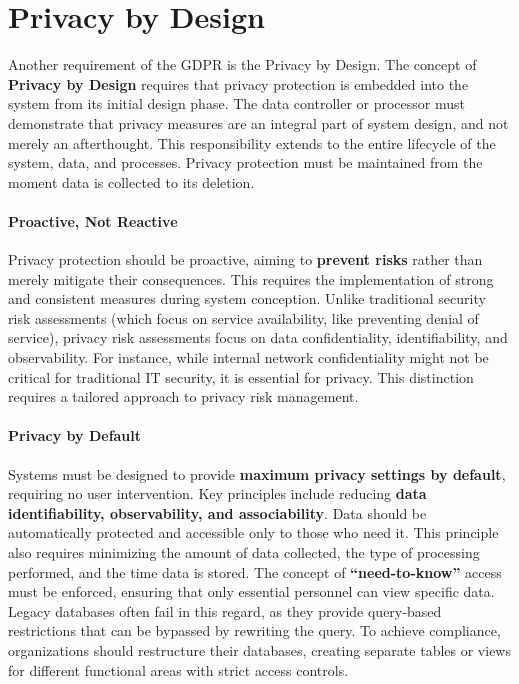 \section{Privacy by Design}
Another requirement of the GDPR is the Privacy by Design.
The concept of \textbf{Privacy by Design} requires that privacy
protection is embedded into the system from its initial design phase.
The data controller or processor must demonstrate that privacy
measures are an integral part of system design, and not merely an
afterthought. This responsibility extends to the entire lifecycle of
the system, data, and processes. Privacy protection must be maintained
from the moment data is collected to its deletion.

\paragraph{Proactive, Not Reactive}  
Privacy protection should be proactive, aiming to \textbf{prevent
risks} rather than merely mitigate their consequences. This requires
the implementation of strong and consistent measures during system
conception. Unlike traditional security risk assessments (which focus
on service availability, like preventing denial of service), privacy
risk assessments focus on data confidentiality, identifiability, and
observability. For instance, while internal network confidentiality
might not be critical for traditional IT security, it is essential for
privacy. This distinction requires a tailored approach to privacy risk
management.  

\paragraph{Privacy by Default}  
Systems must be designed to provide \textbf{maximum privacy settings
by default}, requiring no user intervention. Key principles include
reducing \textbf{data identifiability, observability, and
associability}. Data should be automatically protected and accessible
only to those who need it. This principle also requires minimizing the
amount of data collected, the type of processing performed, and the
time data is stored. The concept of \textbf{“need-to-know”} access
must be enforced, ensuring that only essential personnel can view
specific data. Legacy databases often fail in this regard, as they
provide query-based restrictions that can be bypassed by rewriting the
query. To achieve compliance, organizations should restructure their
databases, creating separate tables or views for different functional
areas with strict access controls.  

